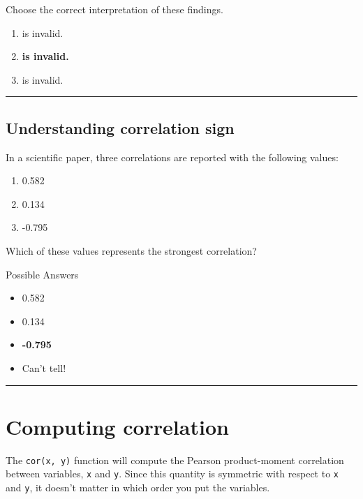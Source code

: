 \documentclass[
]{book}
\providecommand{\tightlist}{%
  \setlength{\itemsep}{0pt}\setlength{\parskip}{0pt}}
\begin{document}
Choose the correct interpretation of these findings.

\begin{enumerate}
\def\labelenumi{\arabic{enumi}.}
\tightlist
\item
  is invalid.
\item
  \textbf{is invalid.}
\item
  is invalid.
\end{enumerate}

\begin{center}\rule{0.5\linewidth}{0.5pt}\end{center}

\hypertarget{understanding-correlation-sign}{%
\subsection*{Understanding correlation sign}\label{understanding-correlation-sign}}

In a scientific paper, three correlations are reported with the following values:

\begin{enumerate}
\def\labelenumi{\arabic{enumi}.}
\tightlist
\item
  0.582
\item
  0.134
\item
  -0.795
\end{enumerate}

Which of these values represents the strongest correlation?

Possible Answers

\begin{itemize}
\item
  0.582
\item
  0.134
\item
  \textbf{-0.795}
\item
  Can't tell!
\end{itemize}

\begin{center}\rule{0.5\linewidth}{0.5pt}\end{center}

\hypertarget{computing-correlation}{%
\section{Computing correlation}\label{computing-correlation}}

The \texttt{cor(x,\ y)} function will compute the Pearson product-moment correlation between variables, \texttt{x} and \texttt{y}. Since this quantity is symmetric with respect to \texttt{x} and \texttt{y}, it doesn't matter in which order you put the variables.
\end{document}
